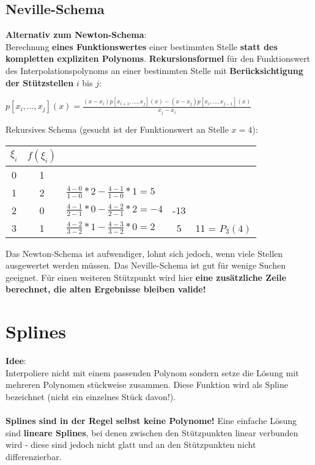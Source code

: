 \documentclass[10pt,a4paper]{article}
\begin{document}
	\subsection{Neville-Schema}
	\textbf{Alternativ zum Newton-Schema}:\\Berechnung \textbf{eines Funktionswertes} einer bestimmten Stelle \textbf{statt des kompletten expliziten Polynoms}. \textbf{Rekursionsformel} für den Funktionswert des Interpolationspolynoms an einer bestimmten Stelle mit \textbf{Berücksichtigung der Stützstellen} $i$ bis $j$:
	\begin{center}
		$p[x_i,...,x_j](x) = \frac{(x - x_i) p[x_{i + 1},...,x_j](x) - (x - x_j)p[x_i,...,x_{j-1}](x)}{x_j - x_i}$
	\end{center}
	Rekursives Schema (gesucht ist der Funktionswert an Stelle $x = 4$):\\
	\begin{center}
		\begin{tabular}{c | c l c c}
			$\xi_i$ & $f(\xi_i)$ & & &\\
			\hline
			0 & 1 & &\\
			1 & 2 & $\frac{4 - 0}{1 - 0} * 2 - \frac{4 - 1}{1 - 0} * 1 = 5$ & &\\
			2 & 0 & $\frac{4 - 1}{2 - 1} * 0 - \frac{4 - 2}{2 - 1} * 2 = -4$ & -13 &\\
			3 & 1 & $\frac{4 - 2}{3 - 2} * 1 - \frac{4 - 3}{3 - 2} * 0 = 2$ & 5 & 11 = $P_3(4)$
		\end{tabular}
	\end{center}
	Das Newton-Schema ist aufwendiger, lohnt sich jedoch, wenn viele Stellen ausgewertet werden müssen. Das Neville-Schema ist gut für wenige Suchen geeignet. Für einen weiteren Stützpunkt wird hier \textbf{eine zusätzliche Zeile berechnet, die alten Ergebnisse bleiben valide!}
	\newpage
	\section{Splines}
	\textbf{Idee}:\\Interpoliere nicht mit einem passenden Polynom sondern setze die Lösung mit mehreren Polynomen stückweise zusammen. Diese Funktion wird als Spline bezeichnet (nicht ein einzelnes Stück davon!).\\\\\textbf{Splines sind in der Regel selbst keine Polynome!} Eine einfache Lösung sind \textbf{lineare Splines}, bei denen zwischen den Stützpunkten linear verbunden wird - diese sind jedoch nicht glatt und an den Stützpunkten nicht differenzierbar.
	
\end{document}
